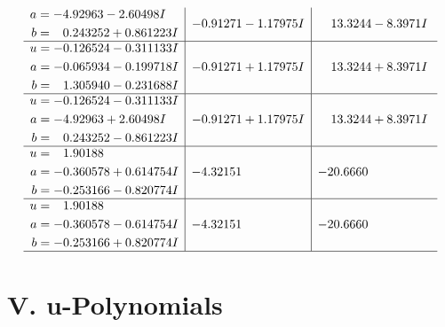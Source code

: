 \documentclass[1p]{elsarticle_modified}
\theoremstyle{definition}
\begin{document}
$$\begin{array}{c|c|c}
\begin{aligned}
a &= -4.92963 - 2.60498 I \\
b &= \phantom{-}0.243252 + 0.861223 I\end{aligned}
 & -0.91271 - 1.17975 I & \phantom{-}13.3244 - 8.3971 I \\ \hline\begin{aligned}
u &= -0.126524 - 0.311133 I \\
a &= -0.065934 - 0.199718 I \\
b &= \phantom{-}1.305940 - 0.231688 I\end{aligned}
 & -0.91271 + 1.17975 I & \phantom{-}13.3244 + 8.3971 I \\ \hline\begin{aligned}
u &= -0.126524 - 0.311133 I \\
a &= -4.92963 + 2.60498 I \\
b &= \phantom{-}0.243252 - 0.861223 I\end{aligned}
 & -0.91271 + 1.17975 I & \phantom{-}13.3244 + 8.3971 I \\ \hline\begin{aligned}
u &= \phantom{-}1.90188\phantom{ +0.000000I} \\
a &= -0.360578 + 0.614754 I \\
b &= -0.253166 - 0.820774 I\end{aligned}
 & -4.32151\phantom{ +0.000000I} & -20.6660\phantom{ +0.000000I} \\ \hline\begin{aligned}
u &= \phantom{-}1.90188\phantom{ +0.000000I} \\
a &= -0.360578 - 0.614754 I \\
b &= -0.253166 + 0.820774 I\end{aligned}
 & -4.32151\phantom{ +0.000000I} & -20.6660\phantom{ +0.000000I}\\
 \hline 
 \end{array}$$\newpage
\newpage\renewcommand{\arraystretch}{1}
\centering \section*{ V. u-Polynomials}
\end{document}
